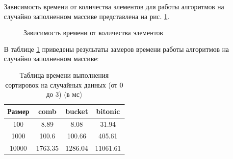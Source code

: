 \documentclass[12pt]{report}
\begin{document}
	Зависимость времени от количества элементов для работы алгоритмов на случайно заполненном массиве представлена на рис. \ref{ris3}.
	
	\begin{center}
		\begin{figure}[H]
		\center
		\caption{Зависимость времени от количества элементов}
		\label{ris3}
		\end{figure}
	\end{center}
	
	В таблице \ref{table:t4} приведены результаты замеров времени работы алгоритмов на случайно заполненном массиве:
	
	\begin{table} [H]
		\caption{Таблица времени выполнения сортировок на случайных данных (от 0 до 3) (в мс)}
		\label{table:t4}
		\begin{center}
			\begin{tabular}{|c | c | c | c|}
				
				\hline
				
				Размер & comb & bucket & bitonic  \\ [0.5ex]
				
				\hline
				
				100 & 8.89 & 8.08 & 31.94 \\ 
				
				\hline 
				
				1000 & 100.6 & 100.66 & 405.61 \\ 
				
				\hline 
				
				10000 & 1763.35 & 1286.04 & 11061.61 \\ 
				
				\hline 
				
			\end{tabular}
		\end{center}
	\end{table}
	
\end{document}

